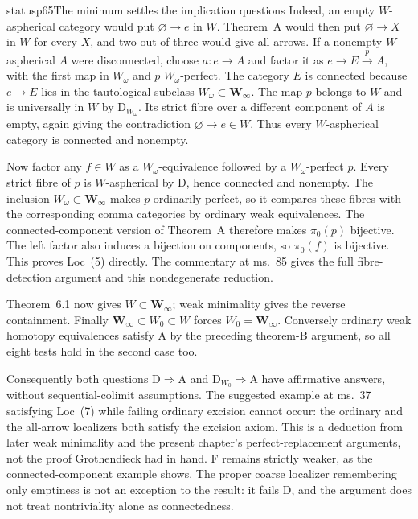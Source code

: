 \begin{dcomment}{status}{p65}{The minimum settles the implication questions}
Indeed, an empty $W$-aspherical category would put $\varnothing\to e$ in $W$. Theorem~A would then put $\varnothing\to X$ in $W$ for every $X$, and two-out-of-three would give all arrows. If a nonempty $W$-aspherical $A$ were disconnected, choose $a:e\to A$ and factor it as $e\to E\xrightarrow{p}A$, with the first map in $W_\omega$ and $p$ $W_\omega$-perfect. The category $E$ is connected because $e\to E$ lies in the tautological subclass $W_\omega\subset\mathbf W_\infty$. The map $p$ belongs to $W$ and is universally in $W$ by $\mathrm D_{W_\omega}$. Its strict fibre over a different component of $A$ is empty, again giving the contradiction $\varnothing\to e\in W$. Thus every $W$-aspherical category is connected and nonempty.

Now factor any $f\in W$ as a $W_\omega$-equivalence followed by a $W_\omega$-perfect $p$. Every strict fibre of $p$ is $W$-aspherical by D, hence connected and nonempty. The inclusion $W_\omega\subset\mathbf W_\infty$ makes $p$ ordinarily perfect, so it compares these fibres with the corresponding comma categories by ordinary weak equivalences. The connected-component version of Theorem~A therefore makes $\pi_0(p)$ bijective. The left factor also induces a bijection on components, so $\pi_0(f)$ is bijective. This proves Loc~(5) directly. The commentary at ms.~85 gives the full fibre-detection argument and this nondegenerate reduction.

Theorem~6.1 now gives $W\subset\mathbf W_\infty$; weak minimality gives the reverse containment. Finally $\mathbf W_\infty\subset W_0\subset W$ forces $W_0=\mathbf W_\infty$. Conversely ordinary weak homotopy equivalences satisfy A by the preceding theorem-B argument, so all eight tests hold in the second case too.

Consequently both questions $\mathrm D\Rightarrow\mathrm A$ and $\mathrm D_{W_0}\Rightarrow\mathrm A$ have affirmative answers, without sequential-colimit assumptions. The suggested example at ms.~37 satisfying Loc~(7) while failing ordinary excision cannot occur: the ordinary and the all-arrow localizers both satisfy the excision axiom. This is a deduction from later weak minimality and the present chapter's perfect-replacement arguments, not the proof Grothendieck had in hand. F remains strictly weaker, as the connected-component example shows. The proper coarse localizer remembering only emptiness is not an exception to the result: it fails D, and the argument does not treat nontriviality alone as connectedness.
\end{dcomment}

